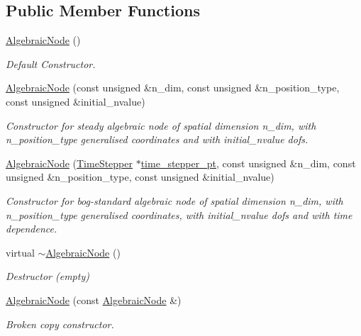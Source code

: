 \subsection*{Public Member Functions}
\begin{DoxyCompactItemize}
\item 
\hyperlink{classoomph_1_1AlgebraicNode_a7e421172a1063fc49f37559f23837763}{Algebraic\+Node} ()
\begin{DoxyCompactList}\small\item\em Default Constructor. \end{DoxyCompactList}\item 
\hyperlink{classoomph_1_1AlgebraicNode_a88eb17187c750f1f1a04d0dd554dd9b5}{Algebraic\+Node} (const unsigned \&n\+\_\+dim, const unsigned \&n\+\_\+position\+\_\+type, const unsigned \&initial\+\_\+nvalue)
\begin{DoxyCompactList}\small\item\em Constructor for steady algebraic node of spatial dimension n\+\_\+dim, with n\+\_\+position\+\_\+type generalised coordinates and with initial\+\_\+nvalue dofs. \end{DoxyCompactList}\item 
\hyperlink{classoomph_1_1AlgebraicNode_ab97ffb4a9663ce90e4d7788315ba31a1}{Algebraic\+Node} (\hyperlink{classoomph_1_1TimeStepper}{Time\+Stepper} $\ast$\hyperlink{classoomph_1_1Data_a5b34970d16205921dca3ada720da8445}{time\+\_\+stepper\+\_\+pt}, const unsigned \&n\+\_\+dim, const unsigned \&n\+\_\+position\+\_\+type, const unsigned \&initial\+\_\+nvalue)
\begin{DoxyCompactList}\small\item\em Constructor for bog-\/standard algebraic node of spatial dimension n\+\_\+dim, with n\+\_\+position\+\_\+type generalised coordinates, with initial\+\_\+nvalue dofs and with time dependence. \end{DoxyCompactList}\item 
virtual \hyperlink{classoomph_1_1AlgebraicNode_af1fef20e4dd950f70003c3db5d289044}{$\sim$\+Algebraic\+Node} ()
\begin{DoxyCompactList}\small\item\em Destructor (empty) \end{DoxyCompactList}\item 
\hyperlink{classoomph_1_1AlgebraicNode_a2dc795a77c106b7dd6bd3ab2c8034956}{Algebraic\+Node} (const \hyperlink{classoomph_1_1AlgebraicNode}{Algebraic\+Node} \&)
\begin{DoxyCompactList}\small\item\em Broken copy constructor. \end{DoxyCompactList}\item 

\end{DoxyCompactItemize}
